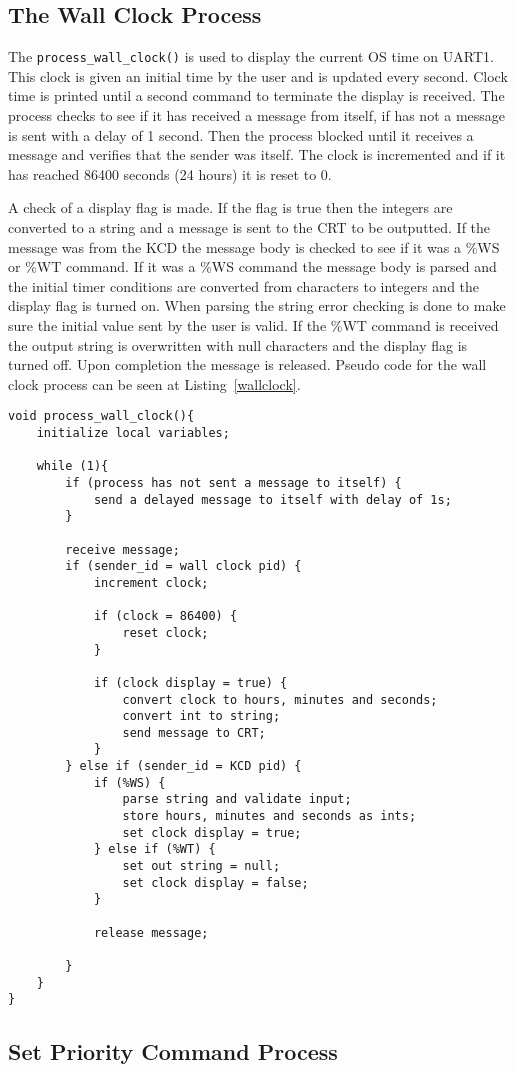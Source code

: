 \documentclass[oneside]{article}
\begin{document}
\subsection*{The Wall Clock Process}

The \texttt{process\_wall\_clock()} is used to display the current OS time on
UART1. This clock is given an initial time by the user and is updated every
second. Clock time is printed until a second command to terminate the display
is received.  The process checks to see if it has received a message from
itself, if has not a message is sent with a delay of 1 second. Then the process
blocked until it receives a message and verifies that the sender was itself.
The clock is incremented and if it has reached 86400 seconds (24 hours) it is
reset to 0. 

A check of a display flag is made. If the flag is true then the integers are
converted to a string and a message is sent to the CRT to be outputted.  If the
message was from the KCD the message body is checked to see if it was a \%WS or
\%WT command. If it was a \%WS command the message body is parsed and the
initial timer conditions are converted from characters to integers and the
display flag is turned on. When parsing the string error checking is done to
make sure the initial value sent by the user is valid. If the \%WT command is
received the output string is overwritten with null characters and the display
flag is turned off. Upon completion the message is released. Pseudo code for
the wall clock process can be seen at Listing~\ref{wallclock}.

\begin{lstlisting}
void process_wall_clock(){
    initialize local variables;

    while (1){
        if (process has not sent a message to itself) {
            send a delayed message to itself with delay of 1s;
        }
        
        receive message;
        if (sender_id = wall clock pid) {
            increment clock;

            if (clock = 86400) {
                reset clock;
            }
            
            if (clock display = true) {
                convert clock to hours, minutes and seconds;
                convert int to string;
                send message to CRT;
            }
        } else if (sender_id = KCD pid) {
            if (%WS) {
                parse string and validate input;
                store hours, minutes and seconds as ints;
                set clock display = true;
            } else if (%WT) {
                set out string = null;
                set clock display = false;
            }
            
            release message;        

        }
    }
}
\end{lstlisting}

\subsection*{Set Priority Command Process} 

\end{document}
